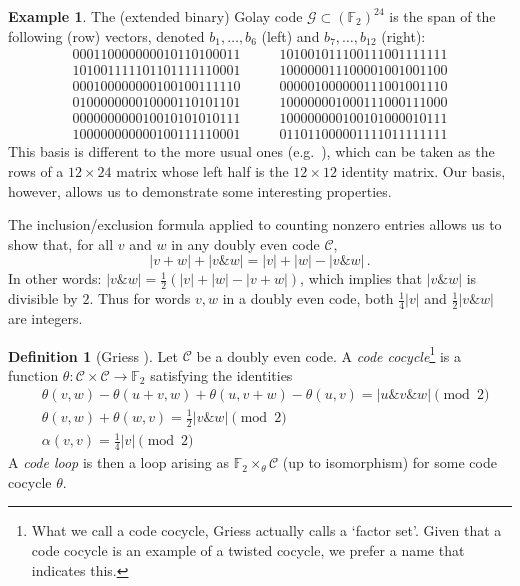 \documentclass{article}
\theoremstyle{plain}
\theoremstyle{definition}
\newtheorem*{definition}{Definition}
\newtheorem{example}{Example}
\def \cC {\mathcal{C}}
\def \cG {\mathcal{G}}
\def \FF {\mathbb{F}}
\newcommand{\AND}{\mathbin{\texttt{\&}}}
\begin{document}
\begin{example}\label{example:Golay}
The (extended binary) Golay code $\cG \subset (\FF_2)^{24}$ is the span of the following (row) vectors, denoted $b_1,\ldots,b_6$ (left) and $b_7,\ldots,b_{12}$ (right):
\[	
	 \begin{array}{c}
     000110000000010110100011 \\
     101001111101101111110001 \\
     000100000000100100111110 \\
     010000000010000110101101 \\
     000000000010010101010111 \\
     100000000000100111110001
     \end{array}
\qquad
    \begin{array}{c}
	 101001011100111001111111 \\
	 100000011100001001001100 \\
	 000001000000111001001110 \\
	 100000001000111000111000 \\
	 100000000100101000010111 \\
	 011011000001111011111111
	 \end{array}
\]
This basis is different to the more usual ones (e.g.\ \cite[Figure 3.4]{SPLAG}), which can be taken as the rows of a $12\times 24$ matrix whose left half is the $12\times 12$ identity matrix.
Our basis, however, allows us to demonstrate some interesting properties.
\end{example}

The inclusion/exclusion formula applied to counting nonzero entries allows us to show that, for all $v$ and $w$ in any doubly even code $\cC$,
\[
	|v+w| + |v\AND w| = |v| + |w| - |v\AND w|\,.
\]
In other words: $|v\AND w| = \frac12(|v| + |w| - |v+w|)$, which implies that $|v\AND w|$ is divisible by $2$.
Thus for words $v,w$ in a doubly even code, both $\frac14|v|$ and $\frac12|v\AND w|$ are integers.

\begin{definition}[Griess \cite{Griess}]
Let $\cC$ be a doubly even code. 
A \emph{code cocycle}\footnote{What we call a code cocycle, Griess actually calls a `factor set'. Given that a code cocycle is an example of a twisted cocycle, we prefer a name that indicates this.} is a function $\theta\colon \cC \times \cC \to \FF_2$ satisfying the identities
\begin{align}
& \theta(v,w)-\theta(u+v,w)+\theta(u,v+w)-\theta(u,v) =|u\AND v \AND w| \pmod 2 \label{eq: code cocycle 1}\\
& \theta(v,w)+\theta(w,v) = {}  \tfrac12|v\AND w| \pmod 2 \label{eq: code cocycle 2}\\
& \alpha(v,v) = {}  \tfrac14|v| \pmod 2\label{eq: code cocycle 3}
\end{align}
A \emph{code loop} is then a loop arising as $\FF_2\times_\theta \cC$ (up to isomorphism) for some code cocycle $\theta$.
\end{definition}
\end{document}
